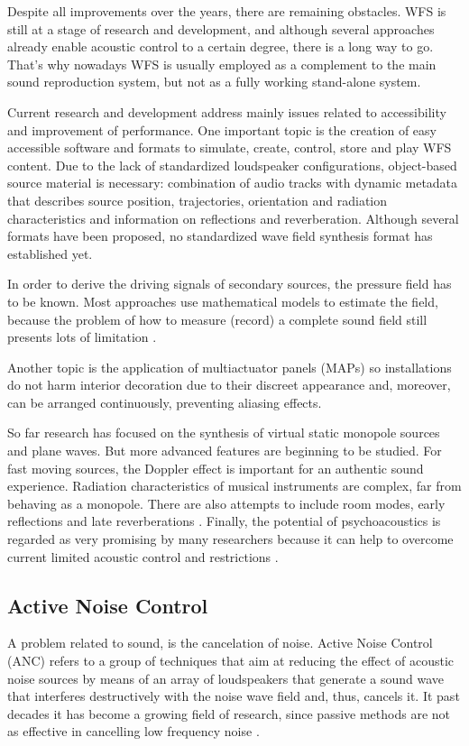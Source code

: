 Despite all improvements over the years, there are remaining obstacles. WFS is still at a stage of research and development, and although several approaches already enable acoustic control to a certain degree, there is a long way to go.
That's why nowadays WFS is usually employed as a complement to the main sound reproduction system, but not as a fully working stand-alone system.

Current research and development address mainly issues related to accessibility and improvement of performance. One important topic is the creation of easy accessible software and formats to simulate, create, control, store and play WFS content. Due to the lack of standardized loudspeaker configurations, object-based source material is necessary: combination of audio tracks with dynamic metadata that describes source position, trajectories, orientation and radiation characteristics and information on reflections and reverberation. Although several formats have been proposed, no standardized wave field synthesis format has established yet.

In order to derive the driving signals of secondary sources, the pressure field has to be known. Most approaches use mathematical models to estimate the field, because the problem of how to measure (record) a complete sound field still presents lots of limitation \cite{Avni2013}.

Another topic is the application of multiactuator panels (MAPs) so installations do not harm interior decoration due to their discreet appearance and, moreover, can be arranged continuously, preventing aliasing effects.

So far research has focused on the synthesis of virtual static monopole sources and plane waves. But more advanced features are beginning to be studied. For fast moving sources, the Doppler effect is important for an authentic sound experience. Radiation characteristics of musical instruments are complex, far from behaving as a monopole. There are also attempts to include room modes, early reflections and late reverberations \cite{Ahrens2014}. Finally, the potential of psychoacoustics is regarded as very promising by many researchers because it can help to overcome current limited acoustic control and restrictions \cite{Musicology}.

\subsection{Active Noise Control}
A problem related to sound, is the cancelation of noise. Active Noise Control (ANC) refers to a group of techniques that aim at reducing the effect of acoustic noise sources by means of an array of loudspeakers that generate a sound wave that interferes destructively with the noise wave field and, thus, cancels it. It past decades it has become a growing field of research, since passive methods are not as effective in cancelling low frequency noise \cite{Lapini2016}.

